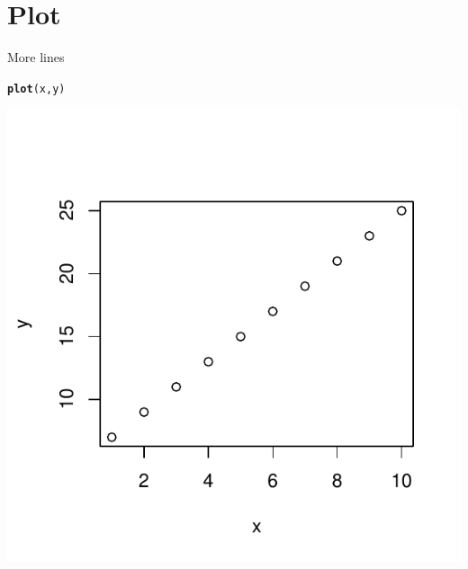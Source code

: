 \documentclass[12pt]{article}\usepackage[]{graphicx}\usepackage[]{color}
\makeatletter
\def\maxwidth{ %
  \ifdim\Gin@nat@width>\linewidth
    \linewidth
  \else
    \Gin@nat@width
  \fi
}
\newcommand{\hlstd}[1]{\textcolor[rgb]{0.345,0.345,0.345}{#1}}%
\newcommand{\hlkwd}[1]{\textcolor[rgb]{0.737,0.353,0.396}{\textbf{#1}}}%
\newenvironment{kframe}{%
 \def\at@end@of@kframe{}%
 \ifinner\ifhmode%
  \def\at@end@of@kframe{\end{minipage}}%
  \begin{minipage}{\columnwidth}%
 \fi\fi%
 \def\FrameCommand##1{\hskip\@totalleftmargin \hskip-\fboxsep
 \colorbox{shadecolor}{##1}\hskip-\fboxsep
     \hskip-\linewidth \hskip-\@totalleftmargin \hskip\columnwidth}%
 \MakeFramed {\advance\hsize-\width
   \@totalleftmargin\z@ \linewidth\hsize
   \@setminipage}}%
 {\par\unskip\endMakeFramed%
 \at@end@of@kframe}
\newenvironment{knitrout}{}{} %
\makeatother
\begin{document}
\section{Plot}

More lines
\begin{knitrout}
\color{fgcolor}\begin{kframe}
\begin{alltt}
\hlkwd{plot}\hlstd{(x, y)}
\end{alltt}
\end{kframe}
\includegraphics[width=\maxwidth]{figure/plot1-1} 

\end{knitrout}
\end{document}
